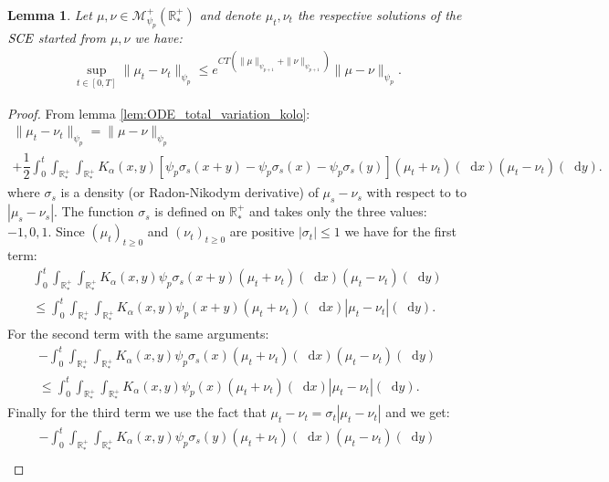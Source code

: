 \documentclass[11pt,a4paper]{article}
\newcommand{\RRP}{\mathbb{R}^+_*}
\newcommand{\MC}{\mathcal{M}}
\newcommand{\SCE}{\emph{SCE}}
\newcommand{\Proc}[1]{\left(#1\right)_{t\geq 0}}
\newcommand{\dd}{\mathop{}\!\mathrm{d}}
\newtheorem{lemma}[theorem]{Lemma}
\begin{document}
\begin{lemma}\label{lem:Lip-smol-TV}
    Let $\mu,\nu \in \MC^+_{\psi_p}(\RRP)$ and denote $\mu_t,\nu_t$ the respective solutions of the $\SCE$ started from $\mu,\nu$ we have:
    \begin{align*}
        \sup\limits_{t \in [0,T]}\| \mu_t - \nu_t\|_{\psi_p} \leq e^{CT\left(\|\mu\|_{\psi_{p+1}} + \|\nu\|_{\psi_{p+1}}\right)}\|\mu- \nu\|_{\psi_p}.
    \end{align*}
\end{lemma}
\begin{proof}
    From lemma \ref{lem:ODE_total_variation_kolo}:
    \begin{multline*}
        \| \mu_t - \nu_t\|_{\psi_p} = \|\mu- \nu\|_{\psi_p} \\
        + \dfrac12\int_0^t \int_{\RRP}\int_{\RRP} K_\alpha(x,y) \left[\psi_p\sigma_s(x+y) - \psi_p\sigma_s(x) - \psi_p\sigma_s(y) \right]\left(\mu_t + \nu_t\right)(\dd x) \left(\mu_t - \nu_t\right)(\dd y).
    \end{multline*}
    where $\sigma_s$ is a density (or Radon-Nikodym derivative) of $\mu_s - \nu_s$ with respect to to $|\mu_s - \nu_s|$. The function $\sigma_s$ is defined on $\RRP$ and takes only the three values: $-1,0,1$. Since $\Proc{\mu_t}$ and $\Proc{\nu_t}$ are positive $|\sigma_t| \leq 1$ we have for the first term:
    \begin{multline*}
        \int_0^t \int_{\RRP}\int_{\RRP} K_\alpha(x,y) \psi_p\sigma_s(x+y)\left(\mu_t + \nu_t\right)(\dd x) \left(\mu_t - \nu_t\right)(\dd y) \\
        \leq \int_0^t \int_{\RRP}\int_{\RRP} K_\alpha(x,y) \psi_p(x+y)\left(\mu_t + \nu_t\right)(\dd x) \left|\mu_t - \nu_t\right|(\dd y) .
    \end{multline*}
    For the second term with the same arguments:
    \begin{multline*}
        -\int_0^t \int_{\RRP}\int_{\RRP} K_\alpha(x,y) \psi_p\sigma_s(x)\left(\mu_t + \nu_t\right)(\dd x) \left(\mu_t - \nu_t\right)(\dd y) \\
        \leq \int_0^t \int_{\RRP}\int_{\RRP} K_\alpha(x,y) \psi_p(x)\left(\mu_t + \nu_t\right)(\dd x) \left|\mu_t - \nu_t\right|(\dd y).
    \end{multline*}
    Finally for the third term we use the fact that $\mu_t - \nu_t = \sigma_t\left| \mu_t - \nu_t \right|$ and we get:
    \begin{multline*}
        -\int_0^t \int_{\RRP}\int_{\RRP} K_\alpha(x,y) \psi_p\sigma_s(y)\left(\mu_t + \nu_t\right)(\dd x) \left(\mu_t - \nu_t\right)(\dd y) \\

\end{multline*}
\end{proof}
\end{document}
